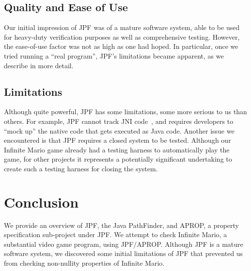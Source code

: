\documentclass[twocolumn]{article}
\begin{document}
\subsection{Quality and Ease of Use}
Our initial impression of JPF was of a mature software system, able to be used for heavy-duty verification purposes as well as comprehensive testing. 
However, the ease-of-use factor was not as high as one had hoped. 
In particular, once we tried running a ``real program'', JPF's limitations became apparent, as we describe in more detail. 

\subsection{Limitations}
Although quite powerful, JPF has some limitations, some more serious to us than others. 
For example, JPF cannot track JNI code~\cite{jni}, and requires developers to ``mock up'' the native code that gets executed as Java code. 
Another issue we encountered is that JPF requires a closed system to be tested. 
Although our Infinite Mario game already had a testing harness to automatically play the game, for other projects it represents a potentially significant undertaking to create such a testing harness for closing the system. 

\section{Conclusion}
We provide an overview of JPF, the Java PathFinder, and APROP, a property specification sub-project under JPF. 
We attempt to check Infinite Mario, a substantial video game program, using JPF/APROP.
Although JPF is a mature software system, we discovered some initial limitations of JPF that prevented us from checking non-nullity properties of Infinite Mario. 



\end{document}
